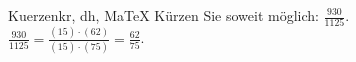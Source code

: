 \begin{MAufgabe}{Kuerzen}{kr, dh, MaTeX}
K\"urzen Sie soweit m\"oglich: $\frac{930}{1125}$.\\ 
\ifLsg\MLoesung
\quad $\frac{930}{1125}=\frac{(15)\cdot(62)}{(15)\cdot(75)}=\frac{62}{75}$.\else\relax\fi
 \end{MAufgabe}